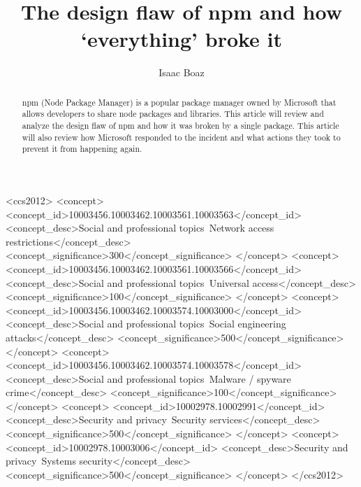 \documentclass[acmsmall]{acmart}
\begin{document}
\title{The design flaw of npm and how `everything' broke it}

\author{Isaac Boaz}

\renewcommand{\shortauthors}{Boaz}

\begin{abstract}
  npm (Node Package Manager) is a popular package manager owned by Microsoft that allows developers
  to share node packages and libraries. This article will review and analyze the design flaw of npm
  and how it was broken by a single package. This article will also review how Microsoft responded to
  the incident and what actions they took to prevent it from happening again.
\end{abstract}


\begin{CCSXML}
  <ccs2012>
  <concept>
  <concept_id>10003456.10003462.10003561.10003563</concept_id>
  <concept_desc>Social and professional topics~Network access restrictions</concept_desc>
  <concept_significance>300</concept_significance>
  </concept>
  <concept>
  <concept_id>10003456.10003462.10003561.10003566</concept_id>
  <concept_desc>Social and professional topics~Universal access</concept_desc>
  <concept_significance>100</concept_significance>
  </concept>
  <concept>
  <concept_id>10003456.10003462.10003574.10003000</concept_id>
  <concept_desc>Social and professional topics~Social engineering attacks</concept_desc>
  <concept_significance>500</concept_significance>
  </concept>
  <concept>
  <concept_id>10003456.10003462.10003574.10003578</concept_id>
  <concept_desc>Social and professional topics~Malware / spyware crime</concept_desc>
  <concept_significance>100</concept_significance>
  </concept>
  <concept>
  <concept_id>10002978.10002991</concept_id>
  <concept_desc>Security and privacy~Security services</concept_desc>
  <concept_significance>500</concept_significance>
  </concept>
  <concept>
  <concept_id>10002978.10003006</concept_id>
  <concept_desc>Security and privacy~Systems security</concept_desc>
  <concept_significance>500</concept_significance>
  </concept>
  </ccs2012>
\end{CCSXML}

\end{document}
